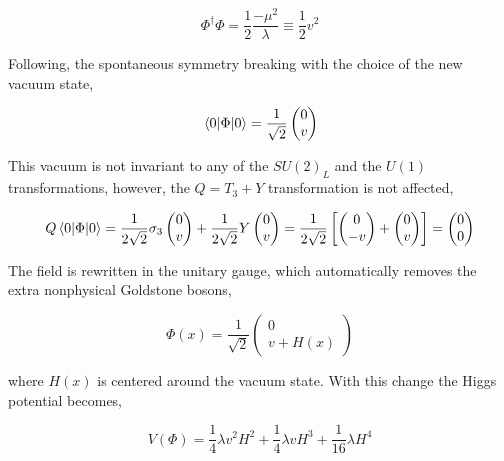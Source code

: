 \begin{equation}
    \Phi^\dag\Phi=\frac{1}{2}\frac{-\mu^2}{\lambda}\equiv\frac{1}{2}v^2
\end{equation}

Following, the spontaneous symmetry breaking with the choice of the new vacuum state,

\begin{equation}
    \expval{\Phi}{0} =\frac{1}{\sqrt{2}}\begin{pmatrix}
    0\\v
    \end{pmatrix}
\end{equation}

This vacuum is not invariant to any of the $SU(2)_L$ and the $U(1)$ transformations, however, the $Q=T_3+Y$ transformation is not affected,

\begin{equation}
    Q\expval{\Phi}{0} = \frac{1}{2\sqrt{2}}\sigma_3\begin{pmatrix}0\\v\end{pmatrix}+\frac{1}{2\sqrt{2}}Y\begin{pmatrix}0\\v\end{pmatrix} = \frac{1}{2\sqrt{2}}\left[ 
    \begin{pmatrix} 0 \\ -v  \end{pmatrix} +
    \begin{pmatrix} 0 \\ v  \end{pmatrix}\right] = \begin{pmatrix}
    0\\0
    \end{pmatrix}
\end{equation}

The field is rewritten in the unitary gauge, which automatically removes the extra nonphysical Goldstone bosons,

\begin{equation}
    \Phi(x) = \frac{1}{\sqrt{2}}\begin{pmatrix}
    0 \\ v+H(x)
    \end{pmatrix}
\end{equation}

where $H(x)$ is centered around the vacuum state. With this change the Higgs potential becomes,

\begin{equation}
    V(\Phi) =\frac{1}{4}\lambda v^2 H^2 + \frac{1}{4} \lambda v H^3 + \frac{1}{16} \lambda H^4
\end{equation}

